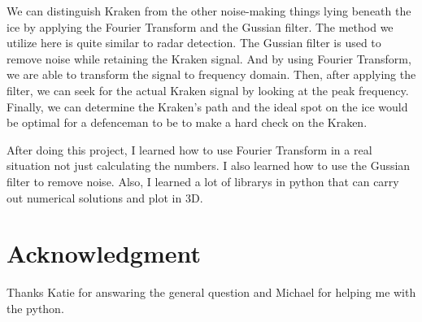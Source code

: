 \documentclass[12pt]{article}%
\begin{document}
We can distinguish Kraken from the other noise-making things lying beneath the ice by applying the Fourier Transform and the Gussian filter. The method we utilize here is quite similar to radar detection. The Gussian filter is used to remove noise while retaining the Kraken signal. And by using Fourier Transform, we are able to transform the signal to frequency domain. Then, after applying the filter, we can seek for the actual Kraken signal by looking at the peak frequency. Finally, we can determine the Kraken's path and the ideal spot on the ice would be optimal for a defenceman to be to make a hard check on the Kraken.

After doing this project, I learned how to use Fourier Transform in a real situation not just calculating the numbers. I also learned how to use the Gussian filter to remove noise. Also, I learned a lot of librarys in python that can carry out numerical solutions and plot in 3D.


\section*{Acknowledgment}

Thanks Katie for answaring the general question and Michael for helping me with the python.
\end{document}
